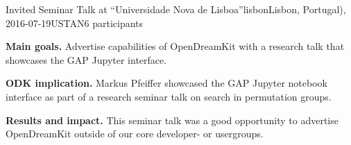 \begin{event}{Invited Seminar Talk at ``Universidade Nova de
    Lisboa''}{lisbon}{Lisbon, Portugal), 2016-07-19}{USTAN}{6 participants}{}

\textbf{Main goals.} Advertise capabilities of OpenDreamKit with a research talk
that showcases the GAP Jupyter interface.

\textbf{ODK implication.} Markus Pfeiffer showcased the GAP Jupyter notebook
interface as part of a research seminar talk on search in permutation groups.

\textbf{Results and impact.} 
This seminar talk was a good opportunity to advertise OpenDreamKit outside of
our core developer- or usergroups.

\end{event}
